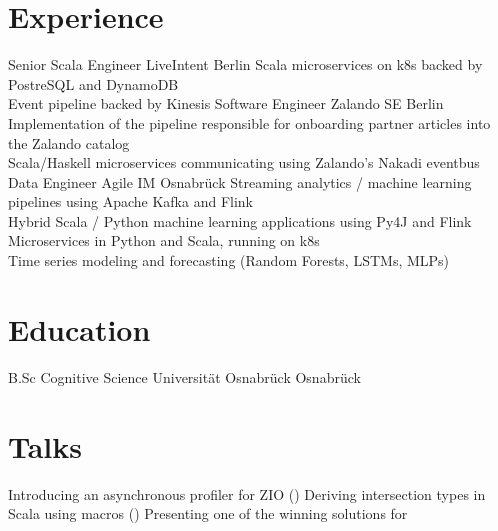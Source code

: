 \documentclass[10pt,a4paper,sans]{moderncv}
\begin{document}
\makecvtitle

\section{Experience}
        {Senior Scala Engineer}
        {LiveIntent}
        {Berlin}
        {}
        {Scala microservices on k8s backed by PostreSQL and DynamoDB \\
         Event pipeline backed by Kinesis}
        {Software Engineer}
        {Zalando SE}
        {Berlin}
        {}
        {Implementation of the pipeline responsible for onboarding partner articles into the Zalando catalog \\
         Scala/Haskell microservices communicating using Zalando's Nakadi eventbus}
        {Data Engineer}
        {Agile IM}
        {Osnabrück}
        {}
        {Streaming analytics / machine learning pipelines using Apache Kafka and Flink \\
         Hybrid Scala / Python machine learning applications using Py4J and Flink \\
         Microservices in Python and Scala, running on k8s \\
         Time series modeling and forecasting (Random Forests, LSTMs, MLPs)}

\section{Education}
\cventry{}
        {B.Sc Cognitive Science}
        {Universität Osnabrück}
        {Osnabrück}
        {}
        {}

\section{Talks}
       {Introducing an asynchronous profiler for ZIO ()}
       {Deriving intersection types in Scala using macros ()}
       {Presenting one of the winning solutions for }
\end{document}
